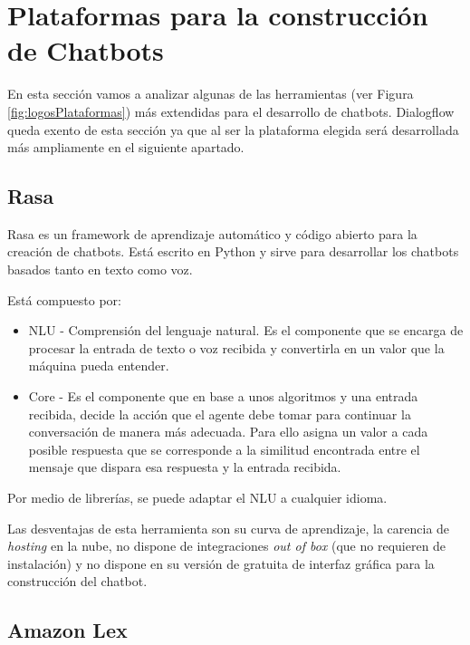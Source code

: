 
\section{Plataformas para la construcción de Chatbots}

En esta sección vamos a analizar algunas de las herramientas (ver Figura \ref{fig:logosPlataformas}) más extendidas para el desarrollo de chatbots. Dialogflow queda exento de esta sección ya que al ser la plataforma elegida será desarrollada más ampliamente en el siguiente apartado. \\


\newpage
\subsection{Rasa \cite{RasaWeb}} 

Rasa es un framework de aprendizaje automático y código abierto para la creación de chatbots. Está escrito en Python y sirve para desarrollar los chatbots basados tanto en texto como voz. \cite{rasa}

Está compuesto por:
\begin{itemize}
	\item 
	NLU - Comprensión del lenguaje natural. Es el componente que se encarga de procesar la entrada de texto o voz recibida y convertirla en un valor que la máquina pueda entender. 
	\item 
	Core - Es el componente que en base a unos algoritmos y una entrada recibida, decide la acción que el agente debe tomar para continuar la conversación de manera más adecuada. Para ello asigna un valor a cada posible respuesta que se corresponde a la similitud encontrada entre el mensaje que dispara esa respuesta y la entrada recibida. 
\end{itemize}

Por medio de librerías, se puede adaptar el NLU a cualquier idioma.

Las desventajas de esta herramienta son su curva de aprendizaje, la carencia de \textit{hosting} en la nube, no dispone de integraciones \textit{out of box} (que no requieren de instalación) y no dispone en su versión de gratuita de interfaz gráfica para la construcción del chatbot.
\newpage

\subsection{Amazon Lex \cite{AmazonLexWeb}}

